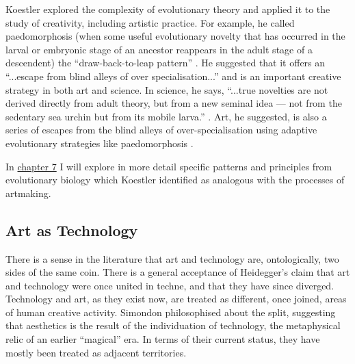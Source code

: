             Koestler explored the complexity of evolutionary theory and applied it to the study of creativity, including artistic practice. For example, he called paedomorphosis (when some useful evolutionary novelty that has occurred in the larval or embryonic stage of an ancestor reappears in the adult stage of a descendent) the “draw-back-to-leap pattern” \citep[p.169]{KoestlerGhost1968}. He suggested that it offers an “...escape from blind alleys of over specialisation...” and is an important creative strategy in both art and science. In science, he says, “...true novelties are not derived directly from adult theory, but from a new seminal idea — not from the sedentary sea urchin but from its mobile larva.” \citep[p.169]{KoestlerGhost1968}. Art, he suggested, is also a series of escapes from the blind alleys of over-specialisation using adaptive evolutionary strategies like paedomorphosis \citep[p.169]{KoestlerGhost1968}.
            
            In \hyperref[ch:EvolutionaryArt]{chapter 7} I will explore in more detail specific patterns and principles from evolutionary biology which Koestler identified as analogous with the processes of artmaking.

    \subsection{Art as Technology} \label{sec:ArtAsTechnology} 

        There is a sense in the literature that art and technology are, ontologically, two sides of the same coin. There is a general acceptance of Heidegger's claim that art and technology were once united in techne, and that they have since diverged. Technology and art, as they exist now, are treated as different, once joined, areas of human creative activity. Simondon philosophised about the split, suggesting that aesthetics is the result of the individuation of technology, the metaphysical relic of an earlier “magical” era. In terms of their current status, they have mostly been treated as adjacent territories.
        
